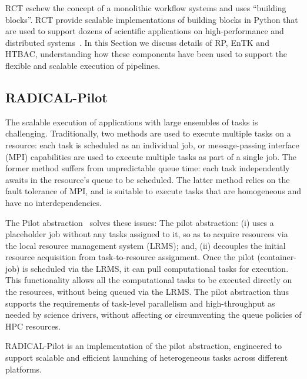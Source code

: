 \documentclass{bmcart}
\begin{document}
RCT eschew the concept of a monolithic workflow systems and uses ``building
blocks''. RCT provide scalable implementations of building blocks in Python
that are used to support dozens of scientific applications on
high-performance and distributed systems~\cite{turilli2016analysis,angius2017converging,treikalis2016repex, balasubramanian2016ensemble,balasubramanian2016extasy}. In this Section we discuss details of RP, EnTK
and HTBAC, understanding how these components have been used to support the
flexible and scalable execution of pipelines.

\subsection{RADICAL-Pilot}\label{ssec:RP}

The scalable execution of applications with large ensembles of tasks is
challenging. Traditionally, two methods are used to execute multiple tasks on
a resource: each task is scheduled as an individual job, or message-passing
interface (MPI) capabilities
are used to execute multiple tasks as part of a single job. The former method
suffers from unpredictable queue time: each task independently awaits in the
resource's queue to be scheduled. The latter method relies on the fault
tolerance of MPI, and is suitable to execute tasks that are homogeneous and
have no interdependencies.

The Pilot abstraction~\cite{turilli2017comprehensive} solves these issues:
The pilot abstraction: (i) uses a placeholder job without any tasks assigned
to it, so as to acquire resources via the local resource management system
(LRMS); and, (ii) decouples the initial resource acquisition from
task-to-resource assignment. Once the pilot (container-job) is scheduled via
the LRMS, it can pull computational tasks for execution. This functionality
allows all the computational tasks to be executed directly on the resources,
without being queued via the LRMS\@. The pilot abstraction thus supports the
requirements of task-level parallelism and high-throughput as needed by
science drivers, without affecting or circumventing the queue policies of HPC
resources.

RADICAL-Pilot is an implementation of the pilot abstraction, engineered to
support scalable and efficient launching of heterogeneous tasks across
different platforms.

\end{document}
